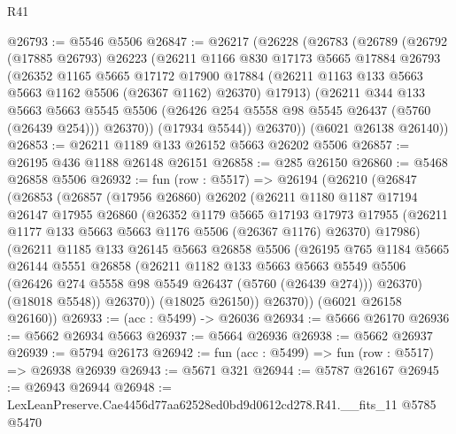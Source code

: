 \begin{lexlean}{R41}
\begin{coremodule}
@26793 := @5546 @5506
@26847 := @26217
    (@26228
      (@26783
        (@26789
          (@26792
            (@17885 @26793)
            @26223
            (@26211
              @1166
              @830
              @17173
              @5665
              @17884
              @26793
              (@26352
                @1165
                @5665
                @17172
                @17900
                @17884
                (@26211 @1163 @133 @5663 @5663 @1162 @5506 (@26367 @1162) @26370)
                @17913)
              (@26211
                @344
                @133
                @5663
                @5663
                @5545
                @5506
                (@26426 @254 @5558 @98 @5545 @26437 (@5760 (@26439 @254)))
                @26370))
            (@17934 @5544))
          @26370))
      (@6021 @26138 @26140))
@26853 := @26211 @1189 @133 @26152 @5663 @26202 @5506
@26857 := @26195 @436 @1188 @26148 @26151
@26858 := @285 @26150
@26860 := @5468 @26858 @5506
@26932 := fun (row : @5517) =>
  @26194
    (@26210
      (@26847
        (@26853
          (@26857
            (@17956 @26860)
            @26202
            (@26211
              @1180
              @1187
              @17194
              @26147
              @17955
              @26860
              (@26352
                @1179
                @5665
                @17193
                @17973
                @17955
                (@26211 @1177 @133 @5663 @5663 @1176 @5506 (@26367 @1176) @26370)
                @17986)
              (@26211
                @1185
                @133
                @26145
                @5663
                @26858
                @5506
                (@26195
                  @765
                  @1184
                  @5665
                  @26144
                  @5551
                  @26858
                  (@26211
                    @1182
                    @133
                    @5663
                    @5663
                    @5549
                    @5506
                    (@26426 @274 @5558 @98 @5549 @26437 (@5760 (@26439 @274)))
                    @26370)
                  (@18018 @5548))
                @26370))
            (@18025 @26150))
          @26370))
      (@6021 @26158 @26160))
@26933 := (acc : @5499) -> @26036
@26934 := @5666 @26170
@26936 := @5662 @26934 @5663
@26937 := @5664 @26936
@26938 := @5662 @26937
@26939 := @5794 @26173
@26942 := fun (acc : @5499) => fun (row : @5517) => @26938 @26939
@26943 := @5671 @321
@26944 := @5787 @26167
@26945 := @26943 @26944
@26948 := LexLeanPreserve.Cae4456d77aa62528ed0bd9d0612cd278.R41.__fits_11 @5785 @5470

\end{coremodule}
\end{lexlean}
